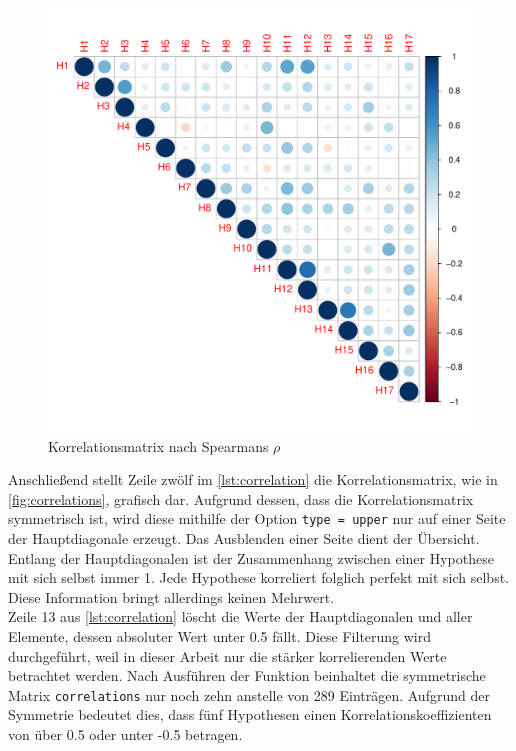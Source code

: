 \begin{figure}[H]
  \centering
  \includegraphics[width=0.65\columnwidth]{figures/plots/correlation.pdf}
  \caption{\label{fig:correlations} Korrelationsmatrix nach Spearmans $\rho$}
\end{figure}

Anschließend stellt Zeile zwölf im \autoref{lst:correlation} die Korrelationsmatrix, wie in \autoref{fig:correlations}, grafisch dar.
Aufgrund dessen, dass die Korrelationsmatrix symmetrisch ist, wird diese mithilfe der Option \texttt{type = upper} nur auf einer Seite der Hauptdiagonale erzeugt.
Das Ausblenden einer Seite dient der Übersicht.
Entlang der Hauptdiagonalen ist der Zusammenhang zwischen einer Hypothese mit sich selbst immer 1.
Jede Hypothese korreliert folglich perfekt mit sich selbst.
Diese Information bringt allerdings keinen Mehrwert.\\

Zeile 13 aus \autoref{lst:correlation} löscht die Werte der Hauptdiagonalen und aller Elemente, dessen absoluter Wert unter 0.5 fällt.
Diese Filterung wird durchgeführt, weil in dieser Arbeit nur die stärker korrelierenden Werte betrachtet werden\cite{cohen-power}.
Nach Ausführen der Funktion beinhaltet die symmetrische Matrix \texttt{correlations} nur noch zehn anstelle von 289 Einträgen.
Aufgrund der Symmetrie bedeutet dies, dass fünf Hypothesen einen Korrelationskoeffizienten von über 0.5 oder unter -0.5 betragen. \\

